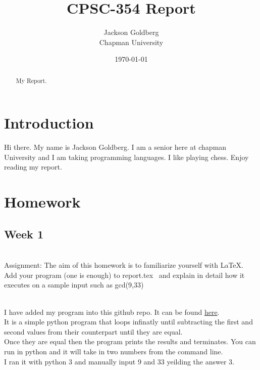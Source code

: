 \documentclass{article}
\title{CPSC-354 Report}
\author{Jackson Goldberg  \\ Chapman University}
\date{\today}
\theoremstyle{theorem}
\theoremstyle{definition}
\theoremstyle{remark}
\begin{document}
\maketitle

\begin{abstract}
My Report.  
\end{abstract}

\tableofcontents

\section{Introduction}\label{intro}
Hi there. My name is Jackson Goldberg. I am a senior here at chapman University and I am taking programming languages. I like playing chess. Enjoy reading my report.

\section{Homework}\label{homework}

\subsection{Week 1}

\\Assignment: The aim of this homework is to familiarize yourself with LaTeX. Add your program (one is enough) to report.tex \
and explain in detail how it executes on a sample input such as gcd(9,33)

\\I have added my program into this github repo. It can be found \href{https://github.com/jacgoldberg/Programming-Lang/blob/main/Euclid.py}{here}.
\\It is a simple python program that loops infinatly until subtracting the first and second values from their counterpart until they are equal.
\\Once they are equal then the program prints the results and terminates. You can run in python and it will take in two numbers from the command line.
\\I ran it with python 3 and manually input 9 and 33 yeilding the answer 3.
\end{document}
